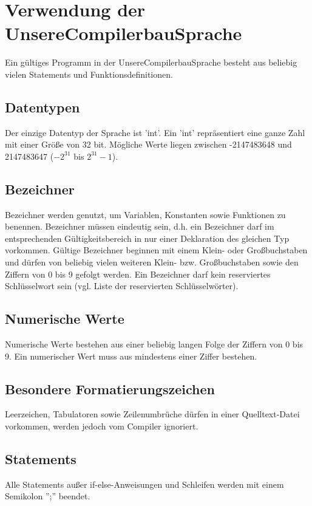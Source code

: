 
\section{Verwendung der UnsereCompilerbauSprache}
Ein gültiges Programm in der UnsereCompilerbauSprache besteht aus beliebig vielen Statements und Funktionsdefinitionen. 

\subsection{Datentypen}
Der einzige Datentyp der Sprache ist 'int'. Ein 'int' repräsentiert eine ganze Zahl mit einer Größe von 32 bit. Mögliche Werte liegen zwischen -2147483648 und 2147483647 ($-2^{31}$ bis $2^{31} - 1$). %

\subsection{Bezeichner}
Bezeichner werden genutzt, um Variablen, Konstanten sowie Funktionen zu benennen.
Bezeichner müssen eindeutig sein, d.h. ein Bezeichner darf im entsprechenden Gültigkeitsbereich in nur einer Deklaration des gleichen Typ vorkommen. Gültige Bezeichner beginnen mit einem Klein- oder Großbuchstaben und dürfen von beliebig vielen weiteren Klein- bzw. Großbuchstaben sowie den Ziffern von 0 bis 9 gefolgt werden. Ein Bezeichner darf kein reserviertes Schlüsselwort sein (vgl. Liste der reservierten Schlüsselwörter).

\subsection{Numerische Werte}
Numerische Werte bestehen aus einer beliebig langen Folge der Ziffern von 0 bis 9. Ein numerischer Wert muss aus mindestens einer Ziffer bestehen.

\subsection{Besondere Formatierungszeichen} 
Leerzeichen, Tabulatoren sowie Zeilenumbrüche dürfen in einer Quelltext-Datei vorkommen, werden jedoch vom Compiler ignoriert.

\subsection{Statements}
Alle Statements außer if-else-Anweisungen und Schleifen werden mit einem Semikolon '';'' beendet.

